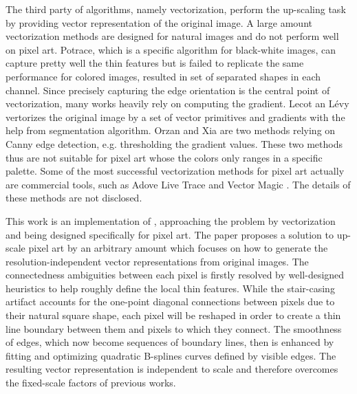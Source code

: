 \documentclass{article}
\begin{document}
The third party of algorithms, namely vectorization, perform the up-scaling task by providing vector representation of the original image. A large amount vectorization methods are designed for natural images \cite{Lai,Lecot:2006:AAR:2383894.2383939} and do not perform well on pixel art. Potrace, which is a specific algorithm for black-white images, can capture pretty well the thin features but is failed to replicate the same performance for colored images, resulted in set of separated shapes in each channel. Since precisely capturing the edge orientation is the central point of vectorization, many works heavily rely on computing the gradient. Lecot an Lévy \cite{Lecot:2006:AAR:2383894.2383939} vertorizes the original image  by a set of vector primitives and gradients with the help from segmentation algorithm.  Orzan \cite{Orzan:2008:DCV:1360612.1360691} and Xia \cite{Xia:2009:PIV:1661412.1618461} are two methods relying on Canny edge detection, e.g. thresholding the gradient values. These two methods thus are not suitable for pixel art whose the colors only ranges in a specific palette. Some of the most successful vectorization methods for pixel art actually are commercial tools, such as Adove Live Trace\cite{ALT} and Vector Magic \cite{vm}. The details of these methods are not disclosed.

This work is an implementation of \cite{Kopf}, approaching the problem by vectorization and being designed specifically for pixel art. The paper proposes a solution to up-scale pixel art by an arbitrary amount which focuses on how to generate the resolution-independent vector representations from original images. The connectedness ambiguities between each pixel is firstly resolved by well-designed heuristics to help roughly define the local thin features. While the stair-casing artifact accounts for the one-point diagonal connections between pixels due to their natural square shape, each pixel will be reshaped in order to create a thin line boundary between them and pixels to which they connect. The smoothness of edges, which now become sequences of boundary lines, then is enhanced by fitting and optimizing quadratic B-splines curves defined by visible edges. The resulting vector representation is independent to scale and therefore overcomes the fixed-scale factors of previous works.

 
\end{document}
